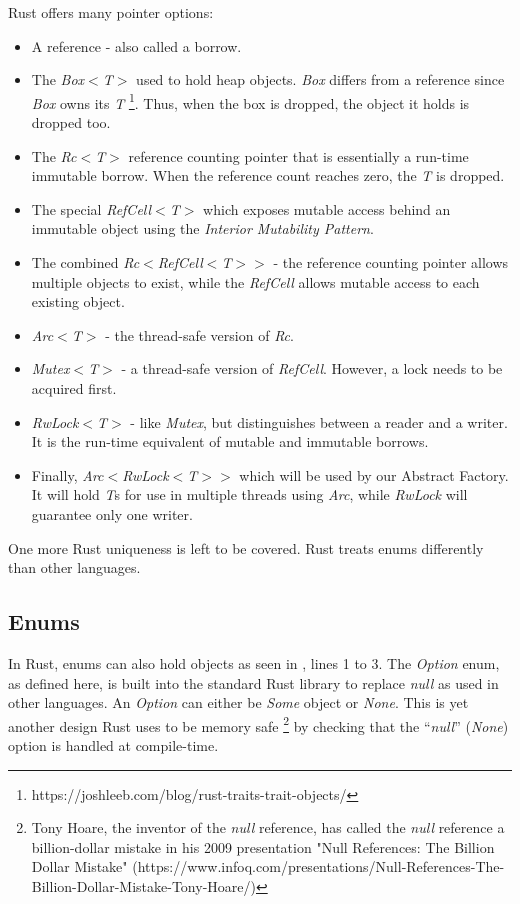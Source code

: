 Rust offers many pointer options: \cite{klabnik_2019_01}
\begin{itemize}
	\item A reference - also called a borrow.
	\item The \textit{Box$<$T$>$} used to hold heap objects.
	      \textit{Box} differs from a reference since \textit{Box} owns its \textit{T} \footnote{https://joshleeb.com/blog/rust-traits-trait-objects/}.
	      Thus, when the box is dropped, the object it holds is dropped too.
	\item The \textit{Rc$<$T$>$} reference counting pointer that is essentially a run-time immutable borrow.
	      When the reference count reaches zero, the \textit{T} is dropped.
	\item The special \textit{RefCell$<$T$>$} which exposes mutable access behind an immutable object using the \textit{Interior Mutability Pattern}.
	\item The combined \textit{Rc$<$RefCell$<$T$>$$>$} - the reference counting pointer allows multiple objects to exist, while the \textit{RefCell} allows mutable access to each existing object.
	\item \textit{Arc$<$T$>$} - the thread-safe version of \textit{Rc}.
	\item \textit{Mutex$<$T$>$} - a thread-safe version of \textit{RefCell}.
	      However, a lock needs to be acquired first.
	\item \textit{RwLock$<$T$>$} - like \textit{Mutex}, but distinguishes between a reader and a writer.
	      It is the run-time equivalent of mutable and immutable borrows.
	\item Finally, \textit{Arc$<$RwLock$<$T$>$$>$} which will be used by our Abstract Factory.
	      It will hold \textit{T}s for use in multiple threads using \textit{Arc}, while \textit{RwLock} will guarantee only one writer.
\end{itemize}

One more Rust uniqueness is left to be covered. Rust treats enums differently than other languages.

\subsection{Enums}
In Rust, enums can also hold objects \cite{klabnik_2019_01} as seen in , lines 1 to 3.
The \textit{Option} enum, as defined here, is built into the standard Rust library \cite{klabnik_2019_01} to replace \textit{null} as used in other languages.
An \textit{Option} can either be \textit{Some} object or \textit{None}.
This is yet another design Rust uses to be memory safe \footnote{Tony Hoare, the inventor of the \textit{null} reference, has called the \textit{null} reference a billion-dollar mistake in his 2009 presentation "Null References: The Billion Dollar Mistake" (https://www.infoq.com/presentations/Null-References-The-Billion-Dollar-Mistake-Tony-Hoare/)} by checking that the ``\textit{null}'' (\textit{None}) option is handled at compile-time.

